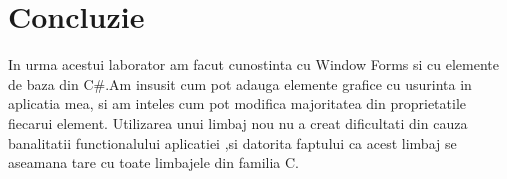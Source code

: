 \documentclass[a4paper, 12pt]{article}
\begin{document}
\newpage
\section{Concluzie}
In urma acestui laborator am facut cunostinta cu Window Forms si cu elemente de baza din C\#.Am insusit cum pot adauga elemente grafice cu usurinta in aplicatia mea, si am inteles cum pot modifica majoritatea din proprietatile fiecarui element.
Utilizarea unui limbaj nou nu a creat dificultati din cauza banalitatii functionalului aplicatiei ,si datorita faptului ca acest limbaj se aseamana tare cu toate limbajele din familia C.
\clearpage
\end{document}
